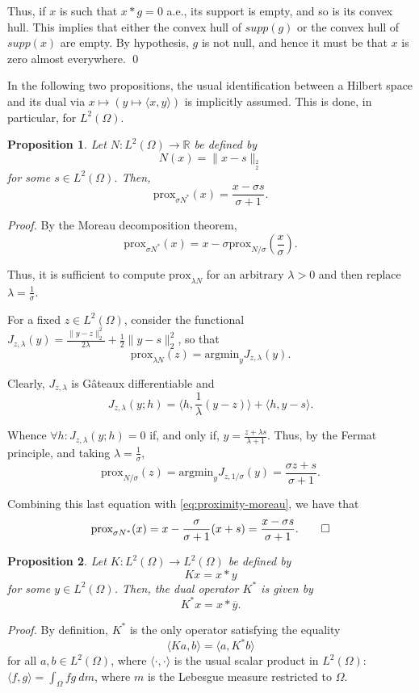 \documentclass[twocolumn,twoside,a4paper,10pt]{IEEEtran}
\newtheorem{proposition}{Proposition}
\begin{document}
Thus, if \(x\) is such that \(x\ast g=0\) a.e., its support is empty, and so is its convex hull. This implies that either the convex hull of \(supp(g)\) or the convex hull of \(supp(x)\) are empty. By hypothesis, \(g\) is not null, and hence it must be that \(x\) is zero almost everywhere. \qed

In the following two propositions, the usual identification between a Hilbert space and its dual via \(x\mapsto(y\mapsto\langle x,y\rangle)\) is implicitly assumed. This is done, in particular, for \(L^2(\Omega)\).

\begin{proposition}\label{prop:proximity-square-norm}
  Let \(N\colon L^2(\Omega)\to \mathbb{R}\) be defined by
  \[
    N(x) = \|x-s\|_{_2^2}
  \]
  for some \(s\in L^2(\Omega)\). Then,
  \[
  \text{prox}_{\sigma N^*}(x) = \frac{x - \sigma s}{\sigma + 1}
  .\]

\end{proposition}
\textit{Proof.}
By the Moreau decomposition theorem,
\begin{equation}\label{eq:proximity-moreau}
  \text{prox}_{\sigma N^*}(x) = x - \sigma\text{prox}_{N/\sigma}\left(\frac x\sigma\right).
\end{equation}

Thus, it is sufficient to compute \(\text{prox}_{\lambda N}\) for an arbitrary \(\lambda > 0\) and then replace \(\lambda = \frac 1\sigma\).

For a fixed \(z\in L^2(\Omega)\), consider the functional \(J_{z, \lambda}(y) = \frac{\|y - z\|_{2}^2}{2\lambda} + \frac12 \|y - s\|_{2}^2\), so that
\[
  \text{prox}_{\lambda N}(z) = \text{argmin}_{y}J_{z, \lambda}(y)
.\]

Clearly, \(J_{z, \lambda}\) is Gâteaux differentiable and
\[
  J_{z, \lambda}(y; h) = \langle h, \frac 1\lambda(y-z)\rangle + \langle h, y-s\rangle
.\]

Whence \(\forall h\colon J_{z, \lambda}(y; h) = 0\) if, and only if, \(y=\frac{z + \lambda s}{\lambda + 1}\). Thus, by the Fermat principle, and taking \(\lambda = \frac 1\sigma\),
\[
  \text{prox}_{N / \sigma}(z) = \text{argmin}_{y}J_{z, 1/\sigma}(y) = \frac{\sigma z+ s}{\sigma + 1}
.\]

Combining this last equation with \cref{eq:proximity-moreau}, we have that
\[
  \text{prox}_{\sigma N^*}(x) = x -\frac{\sigma}{\sigma + 1}(x+s) = \frac{x - \sigma s}{\sigma + 1}
.\qed\]

\begin{proposition}\label{prop:proximity-convolution}
  Let \(K\colon L^2(\Omega)\to L^2(\Omega)\) be defined by
  \[
    Kx = x\ast y
  \]
  for some \(y\in L^2(\Omega)\). Then, the dual operator \(K^*\) is given by \[K^*x=x\ast\overline{y}.\]
\end{proposition}
\textit{Proof. } By definition, \(K^*\) is the only operator satisfying the equality
\[
  \langle Ka, b \rangle = \langle a, K^* b\rangle
\]
for all \(a, b\in L^2(\Omega)\), where \(\langle\cdot,\cdot\rangle\) is the usual scalar product in \(L^2(\Omega)\): \(\langle f, g\rangle = \int_{\Omega}fg~dm\), where \(m\) is the Lebesgue measure restricted to \(\Omega\).
\end{document}
